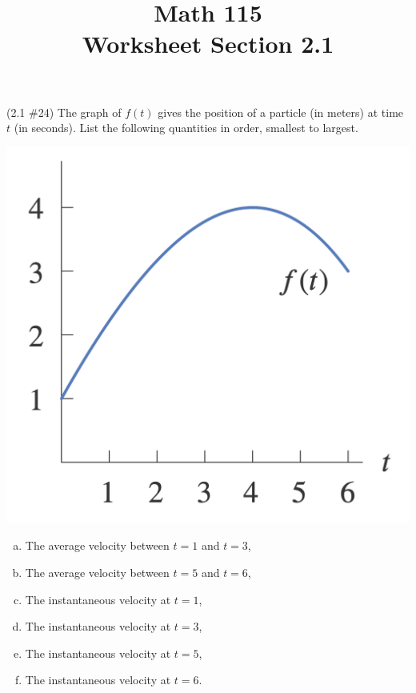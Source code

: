 \documentclass[11pt]{exam}
\title{\vspace{-0.5in} Math 115 \\ Worksheet Section 2.1}
\date{}
\begin{document}
\maketitle
\vspace{-0.75in}
\begin{questions}
  \question (2.1 \#24) The graph of \(f(t)\) gives the position of a
  particle (in meters) at time \(t\) (in seconds). List the following quantities in order,
  smallest to largest.\\
  \begin{minipage}{0.4\linewidth}
    \includegraphics[scale=0.3]{no24graph.png}
  \end{minipage}
  \begin{minipage}{0.6\linewidth}
    \begin{enumerate}[(a)]
    \item The average velocity between \(t=1\) and \(t=3\),
    \item The average velocity between \(t=5\) and \(t=6\),
    \item The instantaneous velocity at \(t=1\),
    \item The instantaneous velocity at \(t=3\),
    \item The instantaneous velocity at \(t=5\),
    \item The instantaneous velocity at \(t=6\).
    \end{enumerate}
  \end{minipage}

\end{questions}
\end{document}
